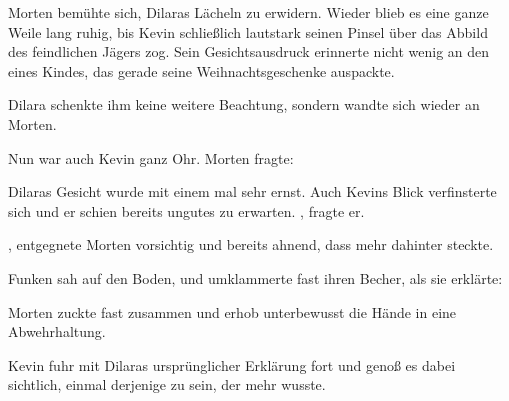 \par

Morten bemühte sich, Dilaras Lächeln zu erwidern. Wieder blieb es eine ganze Weile lang ruhig, bis Kevin schließlich lautstark seinen Pinsel über das Abbild des feindlichen Jägers zog. Sein Gesichtsausdruck erinnerte nicht wenig an den eines Kindes, das gerade seine Weihnachtsgeschenke auspackte.

\par

Dilara schenkte ihm keine weitere Beachtung, sondern wandte sich wieder an Morten. 

\par

Nun war auch Kevin ganz Ohr. Morten fragte: 

\par

Dilaras Gesicht wurde mit einem mal sehr ernst. Auch Kevins Blick verfinsterte sich und er schien bereits ungutes zu erwarten. , fragte er.

\par

, entgegnete Morten vorsichtig und bereits ahnend, dass mehr dahinter steckte.

\par

Funken sah auf den Boden, und umklammerte fast ihren Becher, als sie erklärte: 

\par

Morten zuckte fast zusammen und erhob unterbewusst die Hände in eine Abwehrhaltung. 

\par

Kevin fuhr mit Dilaras ursprünglicher Erklärung fort und genoß es dabei sichtlich, einmal derjenige zu sein, der mehr wusste. 

